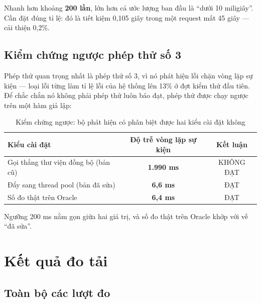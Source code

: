 \documentclass[12pt,a4paper]{article}
\newcommand{\ok}[1]{\textcolor{successgreen}{\bfseries #1}}
\newcommand{\bad}[1]{\textcolor{dangerred}{\bfseries #1}}
\begin{document}
Nhanh hơn khoảng \textbf{200 lần}, lớn hơn cả ước lượng ban đầu là ``dưới 10
mi\-li\-giây''. Cần đặt đúng tỉ lệ: đó là tiết kiệm 0,105 giây trong một
request mất 45 giây --- cải thiện 0,2\%.

\subsection{Kiểm chứng ngược phép thử số 3}

Phép thử quan trọng nhất là phép thử số 3, vì nó phát hiện lỗi chặn vòng lặp sự
kiện --- loại lỗi từng làm tỉ lệ lỗi của hệ thống lên 13\% ở đợt kiểm thử đầu
tiên. Để chắc chắn nó không phải phép thử luôn báo đạt, phép thử được chạy
ngược trên một hàm giả lập:

\begin{table}[H]
\centering
\caption{Kiểm chứng ngược: bộ phát hiện có phân biệt được hai kiểu cài đặt không}
\begin{tabularx}{\textwidth}{Xcc}
\toprule
\rowcolor{lightblue}
Kiểu cài đặt & Độ trễ vòng lặp sự kiện & Kết luận\\
\midrule
Gọi thẳng thư viện đồng bộ (bản cũ) & \bad{1.990 ms} & KHÔNG ĐẠT\\
Đẩy sang thread pool (bản đã sửa) & \ok{6,6 ms} & ĐẠT\\
\midrule
Số đo thật trên Oracle & \ok{6,4 ms} & ĐẠT\\
\bottomrule
\end{tabularx}
\end{table}

Ngưỡng 200 ms nằm gọn giữa hai giá trị, và số đo thật trên Oracle khớp với vế
``đã sửa''.

\section{Kết quả đo tải}

\subsection{Toàn bộ các lượt đo}
\end{document}
